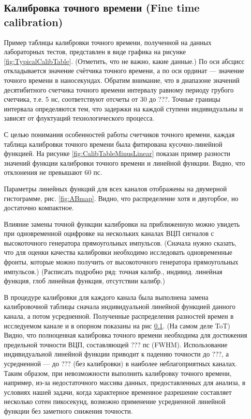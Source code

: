 \subsection{Калибровка точного времени (Fine time calibration)}

Пример таблицы калибровки точного времени, полученной на данных лабораторных тестов, представлен в виде графика на рисунке \ref{fig:TypicalCalibTable}. (Отметить, что не важно, какие данные.) По оси абсцисс откладывается значение счётчика точного времени, а по оси ординат --- значение точного времени в наносекундах. Обратим внимание, что в диапазоне значений десятибитного счетчика точного времени интервалу равному периоду грубого счетчика, т.е. 5 нс, соответствуют отсчеты от 30 до ???. Точные границы интервала определяются тем, что задержки на каждой ступени индивидуальны и зависят от флуктуаций технологического процесса.

С целью понимания особенностей работы счетчиков точного времени, каждая таблица калибровки точного времени была фитирована кусочно-линейной функцией. На рисунке \ref{fig:CalibTableMinusLinear} показан пример разности значений функции калибровки точного времени и линейной функции. Видно, что отклонения не превышают 60 пс.


Параметры линейных функций для всех каналов отображены на двумерной гистограмме, рис. \ref{fig:ABmap}. Видно, что распределение хотя и двугорбое, но достаточно компактное.

Влияние замены точной функции калибровки на приближенную можно увидеть при одновременной оцифровке на нескольких каналах ВЦП сигналов с высокоточного генератора прямоугольных импульсов.
(Сначала нужно сказать, что для оценки качества калибровки необходимо исследовать одновременные фронты, которые можно получить от высокоточного генератора прямоугольных импульсов.)
(Расписать подробно ряд: точная калибр., индивид. линейная функция, глоб линейная функция, отсутствии калибр.)

В процедуре калибровки для каждого канала была выполнена замена калибровочной таблицы сначала индивидуальной линейной функцией данного канала, а потом усредненной. Полученные распределения разностей времен в исследуемом канале и в опорном показаны на рис \ref{}. (На самом деле ToT)
Видно, что полноценная калибровка точного времени необходима для достижения предельной точности ВЦП, составляющей ??? пс (FWHM). Использование индивидуальной линейной функции приводит к падению точности до ???, а усредненной --- до ??? (без калибровки) в наиболее неблагоприятных каналах.
Таким образом, при невозможности выполнить калибровку точного времени, например, из-за недостаточного массива данных, предоставленных для анализа, в условиях нашей задачи, когда характерное временное разрешение составляет несколько сотен пикосекунд, возможно применение усредненной линейной функции без заметного снижения точности.

